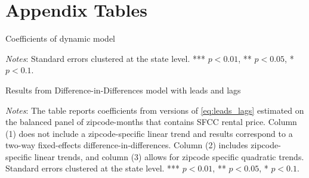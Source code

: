 
\section{Appendix Tables}

\begin{table}[h!]
	\caption{Coefficients of dynamic model}
	\label{tab:dynamic_cumulative}
	\centering
	\resizebox{0.7\textwidth}{!}{
		\vspace{0pt}    
		
	}
	\begin{minipage}{.95\textwidth} \footnotesize
		\vspace{3mm} 
		\textit{Notes}: 
		Standard errors clustered at the state level. *** $p < 0.01$, ** $p < 0.05$, * $p < 0.1$.   
	\end{minipage}
\end{table}

\clearpage
\begin{table}[h!]
	\caption{Results from Difference-in-Differences model with leads and lags}
	\label{tab:dynamic_lags_leads_main}
	\centering
	
	\begin{minipage}{0.95\textwidth} \footnotesize
		\vspace{3mm} 
		\textit{Notes}: The table reports coefficients from versions of \autoref{eq:leads_lags} 
		estimated on the balanced panel of zipcode-months that contains SFCC rental price. Column 
		(1) does not include a zipcode-specific linear trend and results correspond to a two-way 
		fixed-effects difference-in-differences. Column (2) includes zipcode-specific linear trends, 
		and column (3) allows for zipcode specific quadratic trends. Standard errors clustered at 
		the state level. *** $p < 0.01$, ** $p < 0.05$, * $p < 0.1$.
	\end{minipage}
\end{table}


